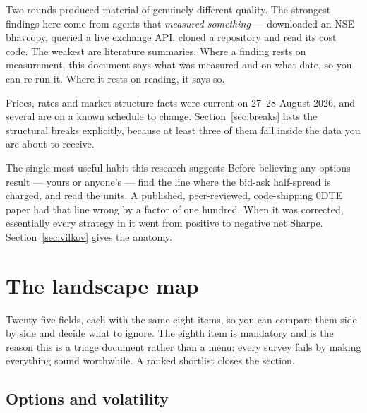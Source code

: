 \documentclass[11pt,a4paper]{article}
\begin{document}
Two rounds produced material of genuinely different quality. The strongest
findings here come from agents that \emph{measured something} --- downloaded an
NSE bhavcopy, queried a live exchange API, cloned a repository and read its cost
code. The weakest are literature summaries. Where a finding rests on measurement,
this document says what was measured and on what date, so you can re-run it.
Where it rests on reading, it says so.

Prices, rates and market-structure facts were current on 27--28 August 2026, and
several are on a known schedule to change. Section~\ref{sec:breaks} lists the
structural breaks explicitly, because at least three of them fall inside the data
you are about to receive.

\begin{keyfact}{The single most useful habit this research suggests}
Before believing any options result --- yours or anyone's --- find the line where
the bid-ask half-spread is charged, and read the units. A published,
peer-reviewed, code-shipping 0DTE paper had that line wrong by a factor of one
hundred. When it was corrected, essentially every strategy in it went from
positive to negative net Sharpe. Section~\ref{sec:vilkov} gives the anatomy.
\end{keyfact}

\newpage
\section{The landscape map}
\label{sec:landscape}

Twenty-five fields, each with the same eight items, so you can compare them side
by side and decide what to ignore. The eighth item is mandatory and is the reason
this is a triage document rather than a menu: every survey fails by making
everything sound worthwhile. A ranked shortlist closes the section.

\subsection{Options and volatility}
\end{document}
